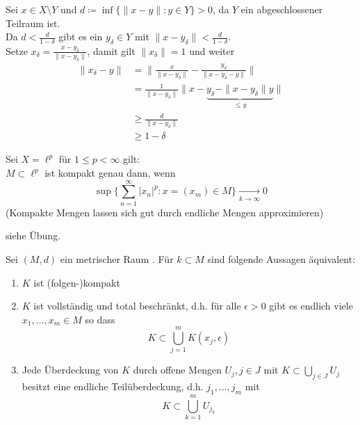 \begin{beweis}
	Sei $x \in X \setminus Y$ und $d \coloneqq \inf \{ \| x - y \|: y \in Y \} > 0$, da $Y$ ein abgeschlossener Teilraum ist. \\
	Da $ d < \frac{d}{1 - \delta}$ gibt es ein $y_{\delta} \in Y$ mit $\| x - y_{\delta} \| < \frac{d}{1 -  \delta}$. \\ 
	Setze $x_{\delta} = \frac{x - y_{\delta}}{\| x - y_{\delta} \|}$, damit gilt $\| x_{\delta} \| = 1$ und weiter 
	\begin{align*}
		\| x_{\delta} - y \| & = \| \frac{x}{\| x - y_{\delta} \|} - \frac{y_\delta}{\| x - y_{\delta} - y\|} \|	\\
			& = \frac{1}{\| x - y_{\delta} \|} \| x - \underbrace{y_{\delta} - \| x - y_{\delta} \| y}_{\leq y} \| \\
			& \geq \frac{d}{\| x - y_{\delta} \|} \\
			& \geq 1 - \delta
	\end{align*}
\end{beweis}


\begin{beispiel} \label{bsp:6.4}
	Sei $X = \ell^{p}$ für $1 \leq p < \infty$ gilt: \\
	$M \subset \ell^{p}$ ist kompakt genau dann, wenn
	\[ \sup \{ \sum_{ n = 1}^{\infty} |x_{n}|^{p} : x = (x_{m}) \in M \} \xrightarrow[k \rightarrow \infty]{} 0 \]	
	(Kompakte Mengen lassen sich gut durch endliche Mengen approximieren)
\end{beispiel}

\begin{beweis}
	siehe Übung.	
\end{beweis}


\begin{satz} \label{satz:6.5}
	Sei $(M, d)$ ein metrischer Raum . Für $k \subset M$ sind folgende Aussagen äquivalent:
	\begin{enumerate}[label=\alph*\upshape)]
		\label{satz:6.5a}
		\item $K$ ist (folgen-)kompakt 
		\label{satz:6.5b}
		\item $K$ ist vollständig und total beschränkt, d.h. für alle $\epsilon > 0$ gibt es endlich viele $x_{1}, \dotsc, x_{m} \in M$ so dass
			\[ K \subset \bigcup_{j = 1}^{m} K(x_{j}, \epsilon) \]
		\label{satz:6.5c}
		\item Jede Überdeckung von $K$ durch offene Mengen $U_{j}, j \in J$ mit $K \subset \bigcup_{j \in J} U_{j}$ besitzt eine endliche Teilüberdeckung, d.h. $j_{1}, \dotsc, j_{m}$ mit
			\[ K \subset \bigcup_{k = 1}^{m} U_{j_{k}} \]
	\end{enumerate}
\end{satz}

